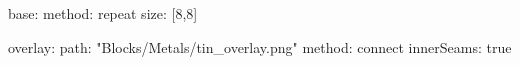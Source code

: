 base:
  method: repeat
  size: [8,8]
  
overlay:
  path: "Blocks/Metals/tin_overlay.png"
  method: connect
  innerSeams: true